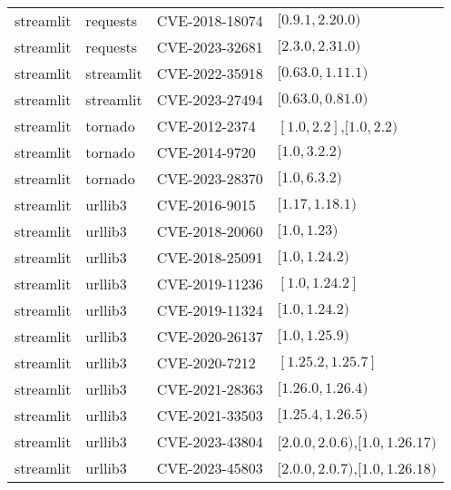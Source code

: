 \begin{tabular}{llll}
streamlit & requests & CVE-2018-18074 & $[0.9.1,2.20.0)$ \\
streamlit & requests & CVE-2023-32681 & $[2.3.0,2.31.0)$ \\
streamlit & streamlit & CVE-2022-35918 & $[0.63.0,1.11.1)$ \\
streamlit & streamlit & CVE-2023-27494 & $[0.63.0,0.81.0)$ \\
streamlit & tornado & CVE-2012-2374 & $[1.0,2.2]$,$[1.0,2.2)$ \\
streamlit & tornado & CVE-2014-9720 & $[1.0,3.2.2)$ \\
streamlit & tornado & CVE-2023-28370 & $[1.0,6.3.2)$ \\
streamlit & urllib3 & CVE-2016-9015 & $[1.17,1.18.1)$ \\
streamlit & urllib3 & CVE-2018-20060 & $[1.0,1.23)$ \\
streamlit & urllib3 & CVE-2018-25091 & $[1.0,1.24.2)$ \\
streamlit & urllib3 & CVE-2019-11236 & $[1.0,1.24.2]$ \\
streamlit & urllib3 & CVE-2019-11324 & $[1.0,1.24.2)$ \\
streamlit & urllib3 & CVE-2020-26137 & $[1.0,1.25.9)$ \\
streamlit & urllib3 & CVE-2020-7212 & $[1.25.2,1.25.7]$ \\
streamlit & urllib3 & CVE-2021-28363 & $[1.26.0,1.26.4)$ \\
streamlit & urllib3 & CVE-2021-33503 & $[1.25.4,1.26.5)$ \\
streamlit & urllib3 & CVE-2023-43804 & $[2.0.0,2.0.6)$,$[1.0,1.26.17)$ \\
streamlit & urllib3 & CVE-2023-45803 & $[2.0.0,2.0.7)$,$[1.0,1.26.18)$ \\
\bottomrule
\end{tabular}
